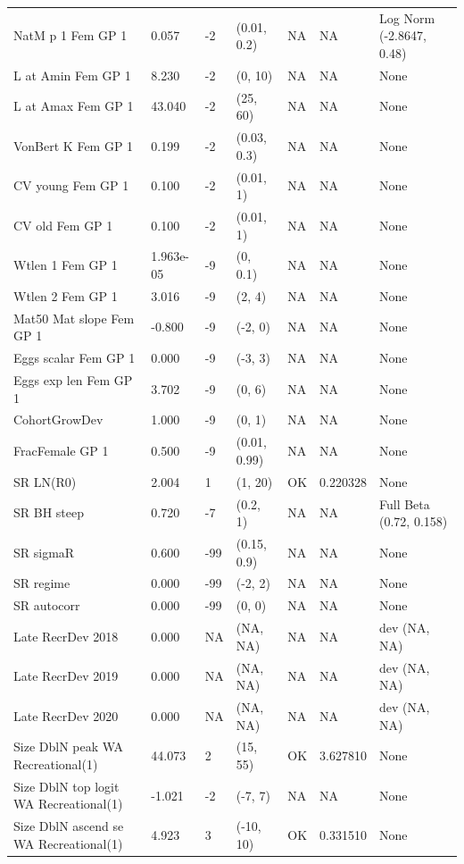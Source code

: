 \documentclass[11pt,
  english,
  a4paper,
]{article}
\begin{document}
\begin{landscape}
\begin{longtable}[t]{>{\raggedright\arraybackslash}p{6cm}lllll>{\raggedright\arraybackslash}p{4cm}}
\endfoot
\bottomrule
\endlastfoot
NatM p 1 Fem GP 1 & 0.057 & -2 & (0.01, 0.2) & NA & NA & Log Norm (-2.8647, 0.48)\\
L at Amin Fem GP 1 & 8.230 & -2 & (0, 10) & NA & NA & None\\
L at Amax Fem GP 1 & 43.040 & -2 & (25, 60) & NA & NA & None\\
VonBert K Fem GP 1 & 0.199 & -2 & (0.03, 0.3) & NA & NA & None\\
CV young Fem GP 1 & 0.100 & -2 & (0.01, 1) & NA & NA & None\\
CV old Fem GP 1 & 0.100 & -2 & (0.01, 1) & NA & NA & None\\
Wtlen 1 Fem GP 1 & 1.963e-05 & -9 & (0, 0.1) & NA & NA & None\\
Wtlen 2 Fem GP 1 & 3.016 & -9 & (2, 4) & NA & NA & None\\
Mat50%
Mat slope Fem GP 1 & -0.800 & -9 & (-2, 0) & NA & NA & None\\
Eggs scalar Fem GP 1 & 0.000 & -9 & (-3, 3) & NA & NA & None\\
Eggs exp len Fem GP 1 & 3.702 & -9 & (0, 6) & NA & NA & None\\
CohortGrowDev & 1.000 & -9 & (0, 1) & NA & NA & None\\
FracFemale GP 1 & 0.500 & -9 & (0.01, 0.99) & NA & NA & None\\
SR LN(R0) & 2.004 & 1 & (1, 20) & OK & 0.220328 & None\\
SR BH steep & 0.720 & -7 & (0.2, 1) & NA & NA & Full Beta (0.72, 0.158)\\
SR sigmaR & 0.600 & -99 & (0.15, 0.9) & NA & NA & None\\
SR regime & 0.000 & -99 & (-2, 2) & NA & NA & None\\
SR autocorr & 0.000 & -99 & (0, 0) & NA & NA & None\\
Late RecrDev 2018 & 0.000 & NA & (NA, NA) & NA & NA & dev (NA, NA)\\
Late RecrDev 2019 & 0.000 & NA & (NA, NA) & NA & NA & dev (NA, NA)\\
Late RecrDev 2020 & 0.000 & NA & (NA, NA) & NA & NA & dev (NA, NA)\\
Size DblN peak WA Recreational(1) & 44.073 & 2 & (15, 55) & OK & 3.627810 & None\\
Size DblN top logit WA Recreational(1) & -1.021 & -2 & (-7, 7) & NA & NA & None\\
Size DblN ascend se WA Recreational(1) & 4.923 & 3 & (-10, 10) & OK & 0.331510 & None\\

\end{longtable}
\end{landscape}
\end{document}
